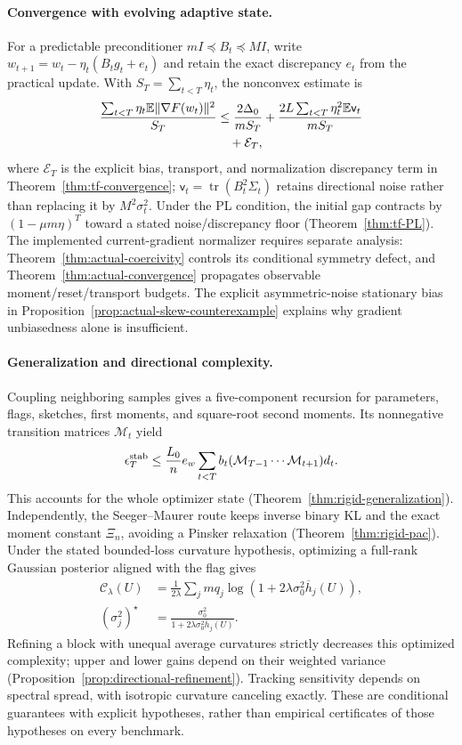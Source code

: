 \paragraph{Convergence with evolving adaptive state.}
For a predictable preconditioner $mI\preceq B_t\preceq MI$, write $w_{t+1}=w_t-\eta_t(B_tg_t+e_t)$ and retain the exact discrepancy $e_t$ from the practical update. With $S_T=\sum_{t<T}\eta_t$, the nonconvex estimate is
\begin{align}
 \frac{\sum_{t<T}\eta_t\mathbb E\|\nabla F(w_t)\|^2}{S_T}
 &\le \frac{2\Delta_0}{mS_T}
 +\frac{2L\sum_{t<T}\eta_t^2\mathbb E\mathsf v_t}{mS_T}\notag\\
 &\quad+\mathcal E_T,
\end{align}
where $\mathcal E_T$ is the explicit bias, transport, and normalization discrepancy term in Theorem~\ref{thm:tf-convergence}; $\mathsf v_t=\operatorname{tr}(B_t^2\Sigma_t)$ retains directional noise rather than replacing it by $M^2\sigma_t^2$. Under the PL condition, the initial gap contracts by $(1-\mu m\eta)^T$ toward a stated noise/discrepancy floor (Theorem~\ref{thm:tf-PL}). The implemented current-gradient normalizer requires separate analysis: Theorem~\ref{thm:actual-coercivity} controls its conditional symmetry defect, and Theorem~\ref{thm:actual-convergence} propagates observable moment/reset/transport budgets. The explicit asymmetric-noise stationary bias in Proposition~\ref{prop:actual-skew-counterexample} explains why gradient unbiasedness alone is insufficient.

\paragraph{Generalization and directional complexity.}
Coupling neighboring samples gives a five-component recursion for parameters, flags, sketches, first moments, and square-root second moments. Its nonnegative transition matrices $\mathcal M_t$ yield
\begin{equation}
 \epsilon_T^{\rm stab}\le\frac{L_0}{n}e_w\sum_{t<T}b_t
 (\mathcal M_{T-1}\cdots\mathcal M_{t+1})d_t.
\end{equation}
This accounts for the whole optimizer state (Theorem~\ref{thm:rigid-generalization}). Independently, the Seeger--Maurer route keeps inverse binary KL and the exact moment constant $\Xi_n$, avoiding a Pinsker relaxation (Theorem~\ref{thm:rigid-pac}). Under the stated bounded-loss curvature hypothesis, optimizing a full-rank Gaussian posterior aligned with the flag gives
\begin{align}
 \mathcal C_\lambda(U)
 &=\frac1{2\lambda}\sum_jmq_j\log(1+2\lambda\sigma_0^2\overline h_j(U)),\\
 (\sigma_j^2)^\star&=\frac{\sigma_0^2}{1+2\lambda\sigma_0^2\overline h_j(U)}.
\end{align}
Refining a block with unequal average curvatures strictly decreases this optimized complexity; upper and lower gains depend on their weighted variance (Proposition~\ref{prop:directional-refinement}). Tracking sensitivity depends on spectral spread, with isotropic curvature canceling exactly. These are conditional guarantees with explicit hypotheses, rather than empirical certificates of those hypotheses on every benchmark.
